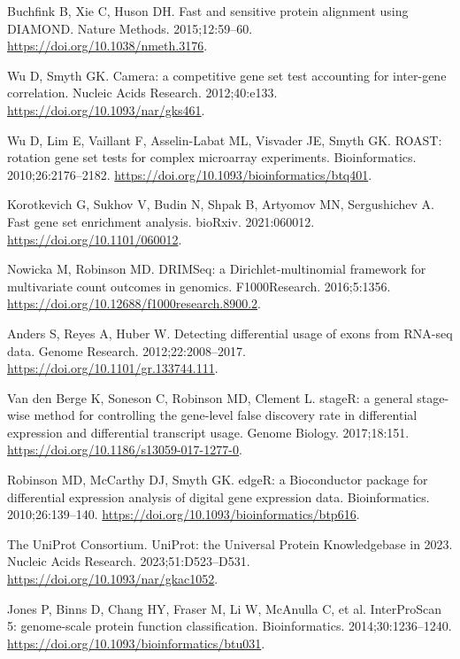 \documentclass[referee,pdflatex,sn-basic,Numbered]{sn-jnl}
\begin{document}
\begin{enumerate}[label={[\arabic*]},itemsep=2pt,leftmargin=2.6em]
\item Buchfink B, Xie C, Huson DH. Fast and sensitive protein alignment using DIAMOND. Nature Methods. 2015;12:59--60. \url{https://doi.org/10.1038/nmeth.3176}.

\item Wu D, Smyth GK. Camera: a competitive gene set test accounting for inter-gene correlation. Nucleic Acids Research. 2012;40:e133. \url{https://doi.org/10.1093/nar/gks461}.

\item Wu D, Lim E, Vaillant F, Asselin-Labat ML, Visvader JE, Smyth GK. ROAST: rotation gene set tests for complex microarray experiments. Bioinformatics. 2010;26:2176--2182. \url{https://doi.org/10.1093/bioinformatics/btq401}.

\item Korotkevich G, Sukhov V, Budin N, Shpak B, Artyomov MN, Sergushichev A. Fast gene set enrichment analysis. bioRxiv. 2021:060012. \url{https://doi.org/10.1101/060012}.

\item Nowicka M, Robinson MD. DRIMSeq: a Dirichlet-multinomial framework for multivariate count outcomes in genomics. F1000Research. 2016;5:1356. \url{https://doi.org/10.12688/f1000research.8900.2}.

\item Anders S, Reyes A, Huber W. Detecting differential usage of exons from RNA-seq data. Genome Research. 2012;22:2008--2017. \url{https://doi.org/10.1101/gr.133744.111}.

\item Van den Berge K, Soneson C, Robinson MD, Clement L. stageR: a general stage-wise method for controlling the gene-level false discovery rate in differential expression and differential transcript usage. Genome Biology. 2017;18:151. \url{https://doi.org/10.1186/s13059-017-1277-0}.

\item Robinson MD, McCarthy DJ, Smyth GK. edgeR: a Bioconductor package for differential expression analysis of digital gene expression data. Bioinformatics. 2010;26:139--140. \url{https://doi.org/10.1093/bioinformatics/btp616}.

\item The UniProt Consortium. UniProt: the Universal Protein Knowledgebase in 2023. Nucleic Acids Research. 2023;51:D523--D531. \url{https://doi.org/10.1093/nar/gkac1052}.

\item Jones P, Binns D, Chang HY, Fraser M, Li W, McAnulla C, et al. InterProScan 5: genome-scale protein function classification. Bioinformatics. 2014;30:1236--1240. \url{https://doi.org/10.1093/bioinformatics/btu031}.


\end{enumerate}
\end{document}
